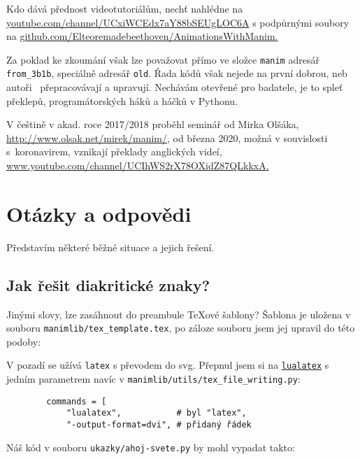Kdo dává přednost videotutoriálům, nechť nahlédne na 
\href{https://www.youtube.com/channel/UCxiWCEdx7aY88bSEUgLOC6A}{\url{youtube.com/channel/UCxiWCEdx7aY88bSEUgLOC6A}} s podpůrnými soubory na 
\href{https://github.com/Elteoremadebeethoven/AnimationsWithManim}{\url{github.com/Elteoremadebeethoven/AnimationsWithManim}.}

Za poklad ke zkoumání však lze považovat přímo ve složce \texttt{manim} adresář \texttt{from\_3b1b}, speciálně adresář \texttt{old}. Řada kódů však nejede na první dobrou, neb autoři \Manim\ přepracovávají a upravují. Nechávám otevřené pro badatele, je to spleť překlepů, programátorských háků a háčků v Pythonu.

V češtině v akad. roce 2017/2018 proběhl seminář od Mirka Olšáka, 
\url{http://www.olsak.net/mirek/manim/}, od března 2020, možná v souvislosti s~koronavirem, vznikají překlady anglických videí, 
\href{https://www.youtube.com/channel/UCIhWS2rX78OXidZ87QLkkxA}{\url{www.youtube.com/channel/UCIhWS2rX78OXidZ87QLkkxA}.}


\section{Otázky a odpovědi}

Představím některé běžné situace a jejich řešení.

\subsection{Jak řešit diakritické znaky?}

Jinými slovy, lze zasáhnout do preambule \TeX ové šablony?  Šablona je uložena v souboru \texttt{manimlib/tex\_template.tex}, po záloze souboru jsem jej upravil do této podoby:



V pozadí se užívá \texttt{latex} s převodem do svg. Přepnul jsem si na 
\href{http://luatex.org/}{\texttt{lualatex}} 
s jedním parametrem navíc v \texttt{manimlib/utils/tex\_file\_writing.py}:
\begin{lstlisting}
        commands = [
            "lualatex",           # byl "latex",
            "-output-format=dvi", # přidaný řádek
\end{lstlisting}

Náš kód v souboru \texttt{ukazky/ahoj-svete.py} by mohl vypadat takto:

